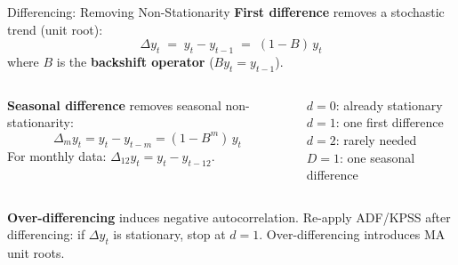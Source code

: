 \documentclass[aspectratio=169, 11pt]{beamer}
\begin{document}
\begin{frame}{Differencing: Removing Non-Stationarity}
  \textbf{First difference} removes a stochastic trend (unit root):
  \[
    \Delta y_t \;=\; y_t - y_{t-1} \;=\; (1-B)\,y_t
  \]
  where $B$ is the \textbf{backshift operator} ($By_t = y_{t-1}$).
  \begin{columns}[T]
      \textbf{Seasonal difference} removes seasonal non-stationarity:
      \[
        \Delta_m y_t = y_t - y_{t-m} = (1-B^m)\,y_t
      \]
      For monthly data: $\Delta_{12} y_t = y_t - y_{t-12}$.
      \begin{keybox}
        {\small
        $d=0$: already stationary\\
        $d=1$: one first difference\\
        $d=2$: rarely needed\\
        $D=1$: one seasonal difference
        }
      \end{keybox}
  \end{columns}
  \vspace{0.1cm}
  \begin{warningbox}
    \textbf{Over-differencing} induces negative autocorrelation.
    Re-apply ADF/KPSS after differencing: if $\Delta y_t$ is stationary,
    stop at $d=1$. Over-differencing introduces MA unit roots.
  \end{warningbox}
\end{frame}
\end{document}
